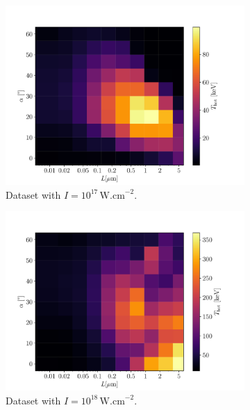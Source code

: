\begin{figure}[ht]
	\centering
	\begin{subfigure}{0.49\textwidth}
		\centering
		\includegraphics[width=\textwidth]{figures/I_1e17t_hot}
		\caption{Dataset with $I = 10^{17} \, \mathrm{W.cm}^{-2}$.}
		\label{fig:dataset1-a}
	\end{subfigure}
	\hfill
	\begin{subfigure}{0.49\textwidth}
		\centering
		\includegraphics[width=\textwidth]{figures/I_1e18t_hot}
		\caption{Dataset with $I =  10^{18} \, \mathrm{W.cm}^{-2}$.}
		\label{fig:datset1-b}
	\end{subfigure}
	\begin{subfigure}{0.49\textwidth}
		\centering

\end{subfigure}
\end{figure}
